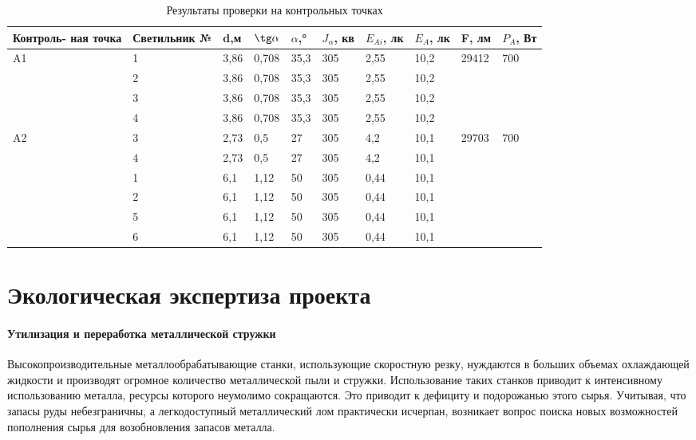 \begin{table}[!h]
	\begin{center}
		\caption{Результаты проверки на контрольных точках}
		\begin{tabular}{|p{22mm}|
			p{25mm}|
			p{8mm}|
			p{12mm}|
			p{10mm}|
			p{10mm}|
			p{10mm}|
			p{10mm}|
			p{11mm}|
			p{8mm}|
		}
	\hline
	Контроль- ная точка  & Светильник № & d,м & $\tg \alpha$ & $\alpha$,° & $J_\alpha$, кв & $E_{Ai}$, лк & $E_A$, лк & F, лм & $P_A$, Вт  \\
	\hline
 	A1 & 1 & 3,86 & 0,708 & 35,3&  305 &2,55 & 10,2 & 29412 & 700 \\
	\cline {2-8}
& 2 & 3,86 & 0,708 & 35,3 & 305 & 2,55 & 10,2 & & \\ 
	\cline {2-8}
& 3 & 3,86 & 0,708 & 35,3 & 305 & 2,55 & 10,2 & & \\
	\cline {2-8}
& 4 & 3,86 & 0,708 & 35,3 & 305 & 2,55 & 10,2 & & \\
	\hline
 	A2 & 3 & 2,73 & 0,5 & 27 &  305 & 4,2 & 10,1 & 29703  & 700 \\
	\cline {2-8}
& 4 & 2,73 & 0,5 & 27 & 305 & 4,2 & 10,1 & & \\
	\cline {2-8}
& 1 & 6,1 & 1,12 & 50 & 305 & 0,44 & 10,1 & & \\
	\cline {2-8}
& 2 & 6,1 & 1,12 & 50 & 305 & 0,44 & 10,1 & & \\
	\cline {2-8}
& 5 & 6,1 & 1,12 & 50 & 305 & 0,44 & 10,1 & & \\
	\cline {2-8}
& 6 & 6,1 & 1,12 & 50 & 305 & 0,44 & 10,1 & & \\
	\hline
		\end{tabular}
		\label{tab:ecolog_results}
	\end{center}
\end{table}

\section{Экологическая экспертиза проекта}
\paragraph{Утилизация и переработка металлической стружки}

Высокопроизводительные металлообрабатывающие станки, использующие скоростную резку, нуждаются в больших объемах охлаждающей жидкости и производят огромное количество металлической пыли и стружки. Использование таких станков приводит к интенсивному использованию металла, ресурсы которого неумолимо сокращаются. Это приводит к дефициту и подорожанью этого сырья. Учитывая, что запасы руды небезграничны, а легкодоступный металлический лом практически исчерпан, возникает вопрос поиска новых возможностей пополнения сырья для возобновления запасов металла.

